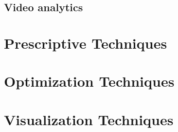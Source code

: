 \section{Video analytics}

\setlength{\footskip}{8mm}

\chapter{Prescriptive Techniques} 
\label{prescriptive-techniques}





%
%
%
%

\setlength{\footskip}{8mm}

\chapter{Optimization Techniques} 
\label{optimization-techniques}





%
%
%
%

\setlength{\footskip}{8mm}

\chapter{Visualization Techniques} 
\label{visualization-techniques}





%
%
%
%

\setlength{\footskip}{8mm}

